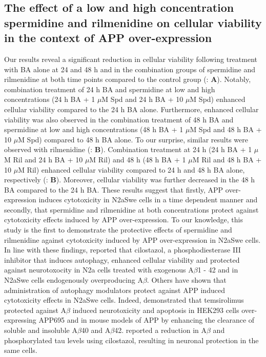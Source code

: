 \subsection{The effect of a low and high concentration spermidine and rilmenidine on cellular viability in the context of APP over-expression}
Our results reveal a significant reduction in cellular viability following treatment with BA alone at 24 and 48 h and in the combination groups of spermidine and rilmenidine at both time points compared to the control group (: \textbf{A}). Notably, combination treatment of 24 h BA and spermidine at low and high concentrations (24 h BA + 1 $\mu$M Spd and 24 h BA + 10 $\mu$M Spd) enhanced cellular viability compared to the 24 h BA alone. Furthermore, enhanced cellular viability was also observed in the combination treatment of 48 h BA and spermidine at low and high concentrations (48 h BA + 1 $\mu$M Spd and 48 h BA + 10 $\mu$M Spd) compared to 48 h BA alone. To our surprise, similar results were observed with rilmenidine (: \textbf{B}). Combination treatment at 24 h (24 h BA + 1 $\mu$M Ril and 24 h BA + 10 $\mu$M Ril) and 48 h (48 h BA + 1 $\mu$M Ril and 48 h BA + 10 $\mu$M Ril) enhanced cellular viability compared to 24 h and 48 h BA alone, respectively (: \textbf{B}). Moreover, cellular viability was further decreased in the 48 h BA compared to the 24 h BA. These results suggest that firstly, APP over-expression induces cytotoxicity in N2aSwe cells in a time dependent manner and secondly, that spermidine and rilmenidine at both concentrations protect against cytotoxicity effects induced by APP over-expression. To our knowledge, this study is the first to demonstrate the protective effects of spermidine and rilmenidine against cytotoxicity induced by APP over-expression in N2aSwe cells. In line with these findings, \citet{Lee2015} reported that cilostazol, a phosphodiesterase III inhibitor that induces autophagy, enhanced cellular viability and protected against neurotoxocity in N2a cells treated with exogenous A$\beta$1 - 42 and in N2aSwe cells endogenously overproducing A$\beta$. Others have shown that administration of autophagy modulators protect against APP induced cytotoxicity effects in N2aSwe cells. Indeed, \citet{Jiang2014a} demonstrated that temsirolimus protected against A$\beta$ induced neurotoxicity and apoptosis in HEK293 cells over-expressing APP695 and in mouse models of APP by enhancing the clearance of soluble and insoluble A$\beta$40 and A$\beta$42. \citet{Park2011} reported a reduction in A$\beta$ and phosphorylated tau levels using cilostazol, resulting in neuronal protection in the same cells.

